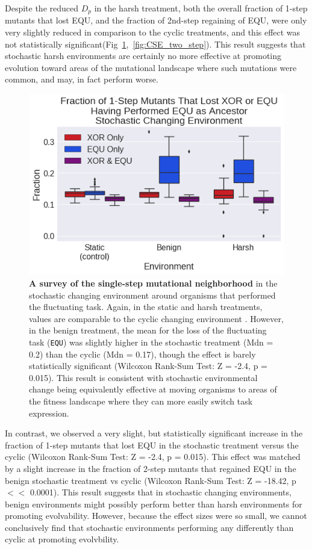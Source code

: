 \documentclass[PhD]{msu-thesis}
\begin{document}
Despite the reduced $D_p$ in the harsh treatment, both the overall fraction of 1-step mutants that lost EQU, and the fraction of 2nd-step regaining of EQU, were only very slightly reduced in comparison to the cyclic treatments, and this effect was not statistically significant(Fig~\ref{fig:CSE_single_step},~\ref{fig:CSE_two_step}). This result suggests that stochastic harsh environments are certainly no more effective at promoting evolution toward areas of the mutational landscape where such mutations were common, and may, in fact perform worse. 

	\begin{figure}[!h] %
	\includegraphics[width=0.75\columnwidth]{figures/CE/CSE_frac_1step__filtered__box.png}
	\caption{\textbf{A survey of the single-step mutational neighborhood} in the stochastic changing environment around organisms that performed the fluctuating task. Again, in the static and harsh treatments, values are comparable to the cyclic changing environment . However, in the benign treatment, the mean for the loss of the fluctuating task (\texttt{EQU}) was slightly higher in the stochastic treatment (Mdn = 0.2) than the cyclic (Mdn = 0.17), though the effect is barely statistically significant (Wilcoxon Rank-Sum Test: Z = -2.4, p = 0.015). This result is consistent with stochastic environmental change being equivalently effective at moving organisms to areas of the fitness landscape where they can more easily switch task expression.%
	}\label{fig:CSE_single_step}
	\end{figure}

In contrast, we observed a very slight, but statistically significant increase in the fraction of 1-step mutants that lost EQU in the stochastic treatment versus the cyclic (Wilcoxon Rank-Sum Test: Z = -2.4, p = 0.015). This effect was matched by a slight increase in the fraction of 2-step mutants that regained EQU in the benign stochastic treatment vs cyclic (Wilcoxon Rank-Sum Test: Z = -18.42, p $<<$ 0.0001). This result suggests that in stochastic changing environments, benign environments might possibly perform better than harsh environments for promoting evolvability. However, because the effect sizes were so small, we cannot conclusively find that stochastic environments performing any differently than cyclic at promoting evolvbility.
\end{document}
